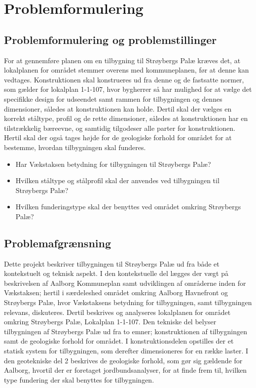 \chapter{Problemformulering}

\section{Problemformulering og problemstillinger}
For at gennemføre planen om en tilbygning til Strøybergs Palæ kræves det, at lokalplanen for området stemmer overens med kommuneplanen, før at denne kan vedtages. Konstruktionen skal konstrueres ud fra denne og de fastsatte normer, som gælder for lokalplan 1-1-107, hvor bygherrer så har mulighed for at vælge det specifikke design for udseendet samt rammen for tilbygningen og dennes dimensioner, således at konstruktionen kan holde. Dertil skal der vælges en korrekt ståltype, profil og de rette dimensioner, således at konstruktionen har en tilstrækkelig bæreevne, og samtidig tilgodeser alle parter for konstruktionen. Hertil skal der også tages højde for de geologiske forhold for området for at bestemme, hvordan tilbygningen skal funderes. 


\begin{itemize} 
	\item Har Vækstaksen betydning for tilbygningen til Strøybergs Palæ?
	\item Hvilken ståltype og stålprofil skal der anvendes ved tilbygningen til Strøybergs Palæ? 
	\item Hvilken funderingstype skal der benyttes ved området omkring Strøybergs Palæ? 
\end{itemize} 

\section{Problemafgrænsning}
Dette projekt beskriver tilbygningen til Strøybergs Palæ ud fra både et kontekstuelt og teknisk aspekt. I den kontekstuelle del lægges der vægt på beskrivelsen af Aalborg Kommuneplan samt udviklingen af områderne inden for Vækstaksen; hertil i særdeleshed området omkring Aalborg Havnefront og Strøybergs Palæ, hvor Vækstaksens betydning for tilbygningen, samt tilbygningen relevans, diskuteres. Dertil beskrives og analyseres lokalplanen for området omkring Strøybergs Palæ, Lokalplan 1-1-107.
\newline \indent{     }  Den tekniske del belyser tilbygningen af Strøybergs Palæ ud fra to emner; konstruktionen af tilbygningen samt de geologiske forhold for området. 
\newline \indent{     }  I konstruktionsdelen opstilles der et statisk system for tilbygningen, som derefter dimensioneres for en række laster. 
\newline \indent{     }  I den geotekniske del 2 beskrives de geologiske forhold, som gør sig gældende for Aalborg, hvortil der er foretaget jordbundsanalyser, for at finde frem til, hvilken type fundering der skal benyttes for tilbygningen.  
